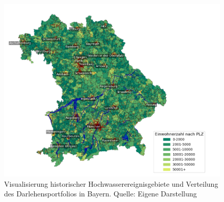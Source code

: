 \begin{figure}[htbp]
    \centering
    \includegraphics[width=1.2\textwidth]{figures/bayern_flut.png} 
    \caption{Visualisierung historischer Hochwasserereignisgebiete und Verteilung des Darlehensportfolios in Bayern. Quelle: Eigene Darstellung}
    \label{fig:bayernflut}
\end{figure}
\FloatBarrier


